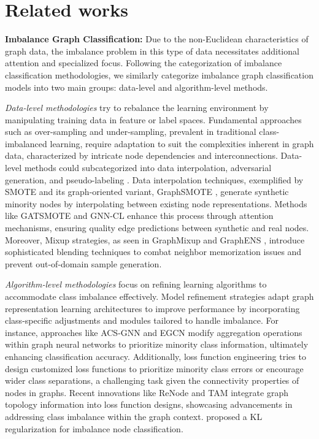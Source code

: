 \section{Related works}
\textbf{Imbalance Graph Classification:}
Due to the non-Euclidean characteristics of graph data, the imbalance problem in this type of data necessitates additional attention and specialized focus. Following the categorization of imbalance classification methodologies, we similarly categorize imbalance graph classification models into two main groups: data-level and algorithm-level methods.

\textit{Data-level methodologies} try to rebalance the learning environment by manipulating training data in feature or label spaces. Fundamental approaches such as over-sampling and under-sampling, prevalent in traditional class-imbalanced learning, require adaptation to suit the complexities inherent in graph data, characterized by intricate node dependencies and interconnections. Data-level methods could subcategorized into data interpolation, adversarial generation, and pseudo-labeling \citep{ma2023class}. Data interpolation techniques, exemplified by SMOTE \citep{chawla2002smote} and its graph-oriented variant, GraphSMOTE \citep{zhao2021graphsmote}, generate synthetic minority nodes by interpolating between existing node representations. Methods like GATSMOTE \citep{liu2022gatsmote} and GNN-CL \citep{li2024graph} enhance this process through attention mechanisms, ensuring quality edge predictions between synthetic and real nodes. Moreover, Mixup strategies, as seen in GraphMixup \citep{wu2022graphmixup} and GraphENS \citep{park2022graphens}, introduce sophisticated blending techniques to combat neighbor memorization issues and prevent out-of-domain sample generation.

\textit{Algorithm-level methodologies} focus on refining learning algorithms to accommodate class imbalance effectively. Model refinement strategies adapt graph representation learning architectures to improve performance by incorporating class-specific adjustments and modules tailored to handle imbalance. For instance, approaches like ACS-GNN \citep{ma2022attention} and EGCN \citep{wang2022effective} modify aggregation operations within graph neural networks to prioritize minority class information, ultimately enhancing classification accuracy. Additionally, loss function engineering tries to design customized loss functions to prioritize minority class errors or encourage wider class separations, a challenging task given the connectivity properties of nodes in graphs. Recent innovations like ReNode \citep{chen2021topology} and TAM \citep{song2022tam} integrate graph topology information into loss function designs, showcasing advancements in addressing class imbalance within the graph context. \citet{jervakani2024klce} proposed a KL regularization for imbalance node classification.

